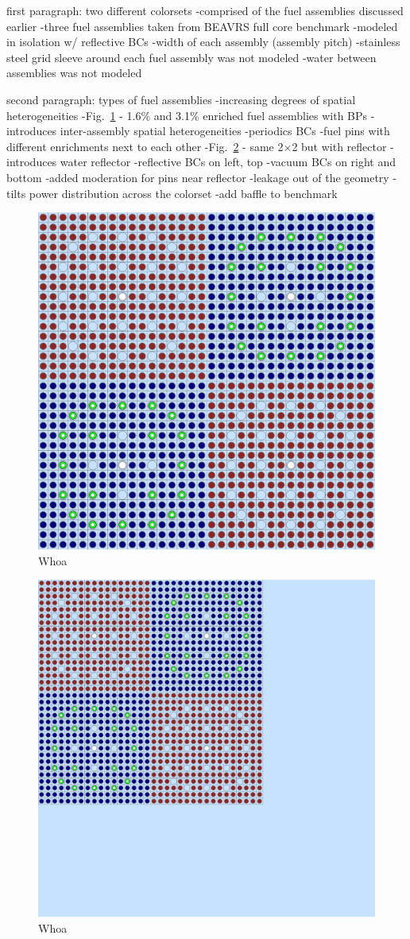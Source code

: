 first paragraph: two different colorsets
-comprised of the fuel assemblies discussed earlier
-three fuel assemblies taken from \ac{BEAVRS} full core benchmark
  -modeled in isolation w/ reflective BCs
-width of each assembly (assembly pitch)
-stainless steel grid sleeve around each fuel assembly was not modeled
-water between assemblies was not modeled

second paragraph: types of fuel assemblies
-increasing degrees of spatial heterogeneities
-Fig.~\ref{fig:chap7-2x2} - 1.6\% and 3.1\% enriched fuel assemblies with \ac{BP}s
  -introduces inter-assembly spatial heterogeneities
  -periodics BCs
  -fuel pins with different enrichments next to each other
-Fig.~\ref{fig:chap7-reflector} - same 2$\times$2 but with reflector
  -introduces water reflector
  -reflective BCs on left, top
  -vacuum BCs on right and bottom
  -added moderation for pins near reflector
  -leakage out of the geometry
  -tilts power distribution across the colorset
  -add baffle to benchmark

\begin{figure}[h!]
  \centering
  \includegraphics[width=0.65\linewidth]{figures/benchmarks/2x2}
\caption[A 2$\times$2 colorset of BEAVRS assemblies]{Whoa}
\label{fig:chap7-2x2}
\end{figure}

\begin{figure}[h!]
  \centering
  \includegraphics[width=0.65\linewidth]{figures/benchmarks/reflector}
\caption[A reflected 2$\times$2 colorset of BEAVRS assemblies]{Whoa}
\label{fig:chap7-reflector}
\end{figure}

